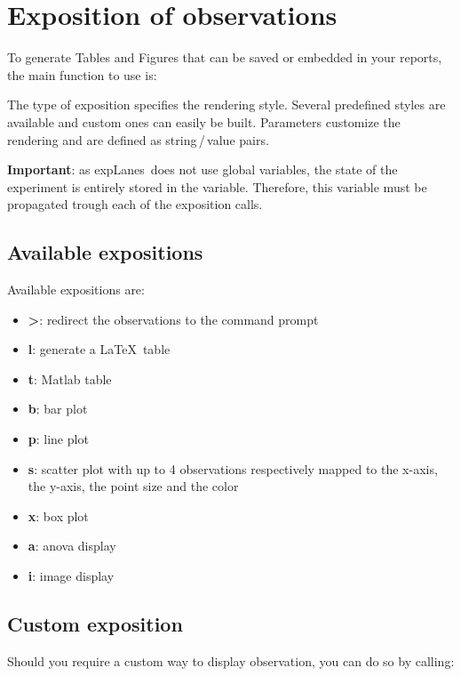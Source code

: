 \documentclass[a4paper,fleqn]{tufte-handout}
\newcommand{\latex}{\LaTeX\ }
\newcommand{\explanes}{\textsf{expLanes}\ }
\begin{document}
\section{Exposition of observations}
\hypertarget{exposition}{}
 
To generate Tables and Figures that can be saved or embedded in your reports, the main function to use is:


The type of exposition specifies the rendering style. Several predefined styles are available and custom ones can easily be built. Parameters customize the rendering and are defined as string\,/\,value pairs.

\textbf{Important}: as \explanes does not use global variables, the state of the experiment is entirely stored in the  variable. Therefore, this variable must be propagated trough each of the exposition calls.

\subsection{Available expositions}

Available expositions are:
\begin{itemize}
\item \textbf{>}: redirect the observations to the command prompt
\item \textbf{l}: generate a \latex table
\item \textbf{t}: Matlab table
\item \textbf{b}: bar plot
\item \textbf{p}: line plot
\item \textbf{s}: scatter plot with up to 4 observations respectively mapped to the x-axis, the y-axis, the point size and the color
\item \textbf{x}: box plot
\item \textbf{a}: anova display
\item \textbf{i}: image display
\end{itemize}

\subsection{Custom exposition}

Should you require a custom way to display observation, you can do so by calling:

\end{document}
